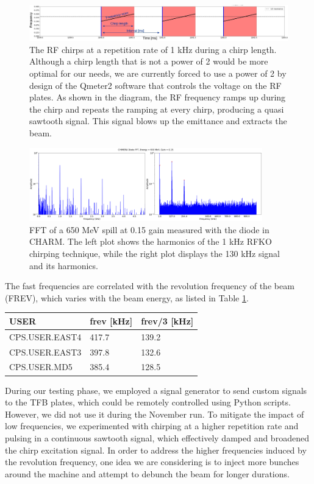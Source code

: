 \begin{figure}[!htb]
\centering
\includegraphics[width=1.0\textwidth]{images/SPILL_TIME_PROFILE/RFKO_chirp_explanation.jpg}
\caption{The RF chirps at a repetition rate of 1 kHz during a chirp length. Although a chirp length that is not a power of 2 would be more optimal for our needs, we are currently forced to use a power of 2 by design of the Qmeter2 software that controls the voltage on the RF plates. As shown in the diagram, the RF frequency ramps up during the chirp and repeats the ramping at every chirp, producing a quasi sawtooth signal. This signal blows up the emittance and extracts the beam.}
\label{fig:RFKO_chirp_explanation}
\end{figure}

\begin{figure}[!htb]
\centering
\includegraphics[width=0.9\textwidth]{images/SPILL_TIME_PROFILE/CHIMERA_diode_FFT_two_scales.png}
\caption{FFT of a 650 MeV spill at 0.15 gain measured with the diode in CHARM. The left plot shows the harmonics of the 1 kHz RFKO chirping technique, while the right plot displays the 130 kHz signal and its harmonics.}
\label{fig:spill_fft_diode}
\end{figure}

The fast frequencies are correlated with the revolution frequency of the beam (FREV), which varies with the beam energy, as listed in Table \ref{table:frev}.

\begin{table}[]
\centering
\begin{tabular}{lll}
USER           & frev [kHz] & frev/3 [kHz] \\
\hline
CPS.USER.EAST4 & 417.7      & 139.2        \\
CPS.USER.EAST3 & 397.8      & 132.6        \\
CPS.USER.MD5   & 385.4      & 128.5       
\label{table:frev}
\end{tabular}
\end{table}

During our testing phase, we employed a signal generator to send custom signals to the TFB plates, which could be remotely controlled using Python scripts. However, we did not use it during the November run. To mitigate the impact of low frequencies, we experimented with chirping at a higher repetition rate and pulsing in a continuous sawtooth signal, which effectively damped and broadened the chirp excitation signal. In order to address the higher frequencies induced by the revolution frequency, one idea we are considering is to inject more bunches around the machine and attempt to debunch the beam for longer durations.